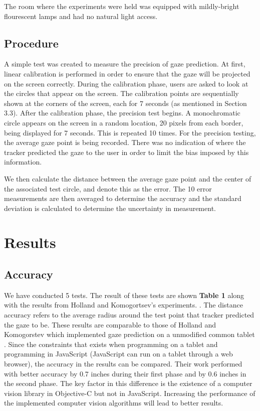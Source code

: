 \documentclass[annual]{acmsiggraph}
\begin{document}
The room where the experiments were held was equipped with mildly-bright
flourescent lamps and had no natural light access. 

\subsection{Procedure}

A simple test was created to measure the precision of gaze prediction. At
first, linear calibration is performed in order to ensure that the gaze will be
projected on the screen correctly. During the calibration phase, users are
asked to look at the circles that appear on the screen. The calibration points
are sequentially shown at the corners of the screen, each for 7 seconds (as
mentioned in Section 3.3).  After the calibration phase, the precision test
begins.  A monochromatic circle appears on the screen in a random location, 20
pixels from each border, being displayed for 7 seconds.  This is repeated 10
times.  For the precision testing, the average gaze point is being recorded.
There was no indication of where the tracker predicted the gaze to the user in
order to limit the bias imposed by this information.

We then calculate the distance between the average gaze point and the center of
the associated test circle, and denote this as the error. The 10 error
measurements are then averaged to determine the accuracy and the standard
deviation is calculated to determine the uncertainty in measurement.

\section{Results}

\subsection{Accuracy}

We have conducted 5 tests. The result of these tests are shown \textbf{Table 1}
along with the results from Holland and Komogortsev's experiments.
.  The distance accuracy refers to the average radius
around the test point that tracker predicted the gaze to be. These results are
comparable to those of Holland and Komogorstev which implemented gaze
prediction on a unmodified common tablet . Since the
constraints that exists when programming on a tablet and programming in
JavaScript (JavaScript can run on a tablet through a web browser), the accuracy
in the results can be compared.  Their work performed with better accuracy by
0.7 inches during their first phase and by 0.6 inches in the second phase. The
key factor in this difference is the existence of a computer vision library in
Objective-C but not in JavaScript.  Increasing the performance of the
implemented computer vision algorithms will lead to better results.
\end{document}

